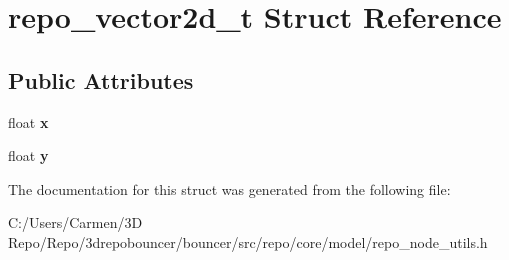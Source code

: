 \hypertarget{structrepo__vector2d__t}{}\section{repo\+\_\+vector2d\+\_\+t Struct Reference}
\label{structrepo__vector2d__t}
\subsection*{Public Attributes}
\begin{DoxyCompactItemize}
\item 
\hypertarget{structrepo__vector2d__t_ad23a694bf6472563ca75baa3879c40be}{}float {\bfseries x}\label{structrepo__vector2d__t_ad23a694bf6472563ca75baa3879c40be}

\item 
\hypertarget{structrepo__vector2d__t_ace5a8377be4c8a9a69e731861df01a8f}{}float {\bfseries y}\label{structrepo__vector2d__t_ace5a8377be4c8a9a69e731861df01a8f}

\end{DoxyCompactItemize}


The documentation for this struct was generated from the following file\+:\begin{DoxyCompactItemize}
\item 
C\+:/\+Users/\+Carmen/3\+D Repo/\+Repo/3drepobouncer/bouncer/src/repo/core/model/repo\+\_\+node\+\_\+utils.\+h\end{DoxyCompactItemize}
